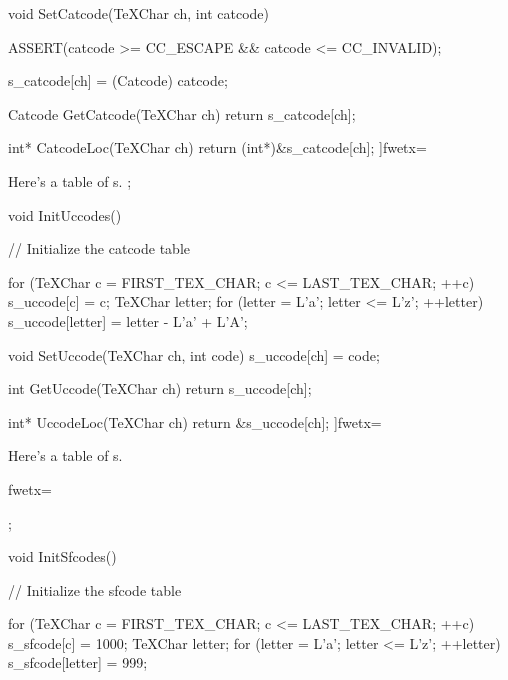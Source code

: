 void SetCatcode(TeXChar ch, int catcode)
{
   ASSERT(catcode >= CC_ESCAPE && catcode <= CC_INVALID);

   s_catcode[ch] = (Catcode) catcode;
}

Catcode GetCatcode(TeXChar ch)
{
   return s_catcode[ch];
}

int* CatcodeLoc(TeXChar ch)
{
   return (int*)&s_catcode[ch];
}
]fwetx=%
\fwcdef 
\fwbeginmacronotes
{}
\fwendmacronotes
\fwendmacro





Here's a table of s.
\fwbeginmacro
{}\fwequals \fwodef \fwbtx[
static int s_uccode[NUM_TEX_CHARS];

void InitUccodes()
{
   // Initialize the catcode table

   for (TeXChar c = FIRST_TEX_CHAR; c <= LAST_TEX_CHAR; ++c){
      s_uccode[c] = c;
   }
   TeXChar letter;
   for (letter = L'a'; letter <= L'z'; ++letter) {
      s_uccode[letter] = letter - L'a' + L'A';
   }
}


void SetUccode(TeXChar ch, int code)
{
   s_uccode[ch] = code;
}

int GetUccode(TeXChar ch)
{
   return s_uccode[ch];
}

int* UccodeLoc(TeXChar ch)
{
   return &s_uccode[ch];
}
]fwetx=%
\fwcdef 
\fwbeginmacronotes
{}
\fwendmacronotes
\fwendmacro



Here's a table of s.

\fwbeginmacro
{}\fwplusequals \fwodef {}fwetx=%
\fwcdef 
\fwbeginmacronotes
{}
\fwendmacronotes
\fwendmacro


\fwbeginmacro
{}\fwequals \fwodef \fwbtx[
static int s_sfcode[NUM_TEX_CHARS];

void InitSfcodes()
{
   // Initialize the sfcode table

   for (TeXChar c = FIRST_TEX_CHAR; c <= LAST_TEX_CHAR; ++c){
      s_sfcode[c] = 1000;
   }
   TeXChar letter;
   for (letter = L'a'; letter <= L'z'; ++letter) {
      s_sfcode[letter] = 999;
   }
}


